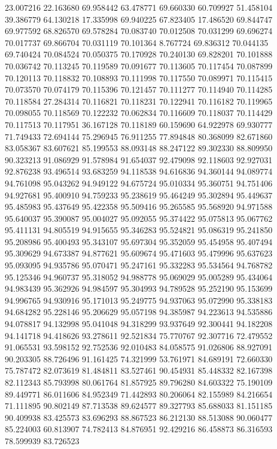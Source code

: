 23.007216
22.163680
69.958442
63.478771
69.660330
60.709927
51.458104
39.386779
64.130218
17.335998
69.940225
67.823405
17.486520
69.844747
69.977592
68.826570
69.578284
70.083740
70.012508
70.031299
69.696274
70.017737
69.866704
70.031119
70.101364
8.767724
69.836312
70.044135
69.740424
70.084524
70.050375
70.170928
70.240130
69.828201
70.101888
70.036742
70.113245
70.119589
70.091677
70.113605
70.117454
70.087899
70.120113
70.118832
70.108893
70.111998
70.117550
70.089971
70.115415
70.073570
70.074179
70.115396
70.121457
70.111277
70.114940
70.114285
70.118584
27.284314
70.116821
70.118231
70.122941
70.116182
70.119965
70.098055
70.118569
70.122232
70.062834
70.116609
70.118037
70.114429
70.117513
70.117951
36.167128
70.118189
60.159690
64.922978
69.930777
71.749433
72.694144
75.296945
76.911255
77.894848
80.368099
82.671860
83.058367
83.607621
85.199553
88.093148
88.247122
89.302330
88.809950
90.323213
91.086929
91.578984
91.654037
92.479098
92.118603
92.927031
92.876238
93.496514
93.683259
94.118538
94.616836
94.360144
94.089774
94.761098
95.043262
94.949122
94.675724
95.010334
95.360751
94.751406
94.927681
95.400910
94.759233
95.238619
95.464249
95.302894
95.449637
95.485983
95.437649
95.422358
95.509416
95.265585
95.568920
94.971588
95.640037
95.390087
95.004027
95.092055
95.374422
95.075813
95.067762
95.411131
94.805519
94.915655
95.346283
95.524821
95.086319
95.241850
95.208986
95.400493
95.343107
95.697304
95.352059
95.454958
95.407494
95.309629
94.673387
94.877621
95.609674
95.471603
95.479996
95.637623
95.093095
94.935786
95.070471
95.247161
95.332283
95.534564
94.768782
95.125346
94.960737
95.318052
94.988778
95.069029
95.005289
95.434064
94.983439
95.362926
94.984597
95.304993
94.789528
95.252190
95.153699
94.996765
94.930916
95.171013
95.249775
94.937063
95.072990
95.338183
94.684282
95.228146
95.206629
95.057198
94.385987
94.223613
94.535886
94.078817
94.132998
95.041048
94.318299
93.937649
92.300441
94.182208
94.141718
94.418626
93.278611
92.521834
75.770767
92.307716
72.479552
91.065531
93.598152
92.752536
92.010483
84.058575
91.026806
88.927091
90.203305
88.726496
91.161425
74.321999
53.761971
84.689191
72.660330
75.787472
82.073619
81.484811
83.527461
90.454931
85.448332
82.167398
82.112343
85.793998
80.061764
81.857925
89.796280
84.603322
75.190109
89.449771
86.011606
84.952349
71.442893
80.206064
82.155989
84.216654
71.111895
90.802149
87.713538
89.624577
89.327793
85.688033
81.151185
90.409938
83.425573
83.696293
88.867523
86.212130
88.513088
90.060477
85.224003
60.813907
74.782413
84.876951
92.429216
86.458873
86.316593
78.599939
83.726523
